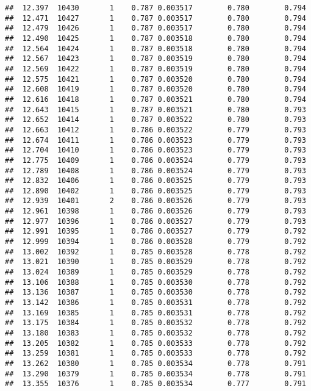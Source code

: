 \documentclass[
]{book}
\begin{document}
\begin{verbatim}
##  12.397  10430       1    0.787 0.003517        0.780        0.794
##  12.471  10427       1    0.787 0.003517        0.780        0.794
##  12.479  10426       1    0.787 0.003517        0.780        0.794
##  12.490  10425       1    0.787 0.003518        0.780        0.794
##  12.564  10424       1    0.787 0.003518        0.780        0.794
##  12.567  10423       1    0.787 0.003519        0.780        0.794
##  12.569  10422       1    0.787 0.003519        0.780        0.794
##  12.575  10421       1    0.787 0.003520        0.780        0.794
##  12.608  10419       1    0.787 0.003520        0.780        0.794
##  12.616  10418       1    0.787 0.003521        0.780        0.794
##  12.643  10415       1    0.787 0.003521        0.780        0.793
##  12.652  10414       1    0.787 0.003522        0.780        0.793
##  12.663  10412       1    0.786 0.003522        0.779        0.793
##  12.674  10411       1    0.786 0.003523        0.779        0.793
##  12.704  10410       1    0.786 0.003523        0.779        0.793
##  12.775  10409       1    0.786 0.003524        0.779        0.793
##  12.789  10408       1    0.786 0.003524        0.779        0.793
##  12.832  10406       1    0.786 0.003525        0.779        0.793
##  12.890  10402       1    0.786 0.003525        0.779        0.793
##  12.939  10401       2    0.786 0.003526        0.779        0.793
##  12.961  10398       1    0.786 0.003526        0.779        0.793
##  12.977  10396       1    0.786 0.003527        0.779        0.793
##  12.991  10395       1    0.786 0.003527        0.779        0.792
##  12.999  10394       1    0.786 0.003528        0.779        0.792
##  13.002  10392       1    0.785 0.003528        0.778        0.792
##  13.021  10390       1    0.785 0.003529        0.778        0.792
##  13.024  10389       1    0.785 0.003529        0.778        0.792
##  13.106  10388       1    0.785 0.003530        0.778        0.792
##  13.136  10387       1    0.785 0.003530        0.778        0.792
##  13.142  10386       1    0.785 0.003531        0.778        0.792
##  13.169  10385       1    0.785 0.003531        0.778        0.792
##  13.175  10384       1    0.785 0.003532        0.778        0.792
##  13.180  10383       1    0.785 0.003532        0.778        0.792
##  13.205  10382       1    0.785 0.003533        0.778        0.792
##  13.259  10381       1    0.785 0.003533        0.778        0.792
##  13.262  10380       1    0.785 0.003534        0.778        0.791
##  13.290  10379       1    0.785 0.003534        0.778        0.791
##  13.355  10376       1    0.785 0.003534        0.777        0.791

\end{verbatim}
\end{document}

